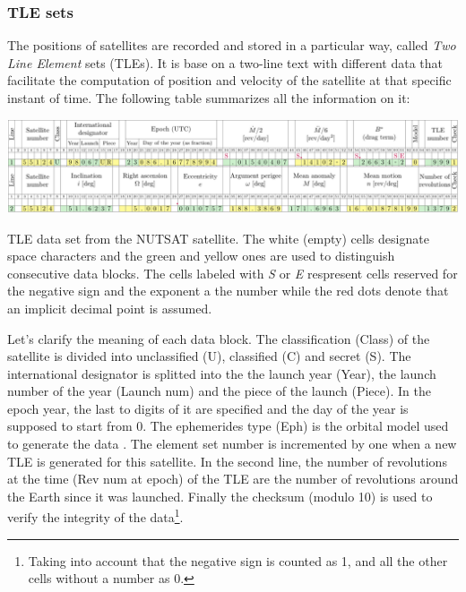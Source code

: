 \documentclass[../main.tex]{subfiles}
\begin{document}
\subsubsection{TLE sets}
The positions of satellites are recorded and stored in a particular way, called \emph{Two Line Element} sets (TLEs). It is base on a two-line text with different data that facilitate the computation of position and velocity of the satellite at that specific instant of time. The following table summarizes all the information on it:
\begin{table}
  \centering
  \begin{minipage}[ht]{\textwidth}
    \centering
    \includegraphics[width=\textwidth]{Images/TLE.pdf}
  \end{minipage}
  \caption{TLE data set from the NUTSAT satellite. The white (empty) cells designate space characters and the green and yellow ones are used to distinguish consecutive data blocks. The cells labeled with \textit{S} or \textit{E} respresent cells reserved for the negative sign and the exponent a the number while the red dots denote that an implicit decimal point is assumed.}
  \label{tab:TLE}
\end{table}
Let's clarify the meaning of each data block. The classification (Class) of the satellite is divided into unclassified (U), classified (C) and secret (S). The international designator is splitted into the the launch year (Year), the launch number of the year (Launch num) and the piece of the launch (Piece). In the epoch year, the last to digits of it are specified and the day of the year is supposed to start from 0. The ephemerides type (Eph) is the orbital model used to generate the data \cite{celestrak,wiki:spg}. The element set number is incremented by one when a new TLE is generated for this satellite. In the second line, the number of revolutions at the time (Rev num at epoch) of the TLE are the number of revolutions around the Earth since it was launched. Finally the checksum (modulo 10) is used to verify the integrity of the data\footnote{Taking into account that the negative sign is counted as 1, and all the other cells without a number as 0.}.
\end{document}
